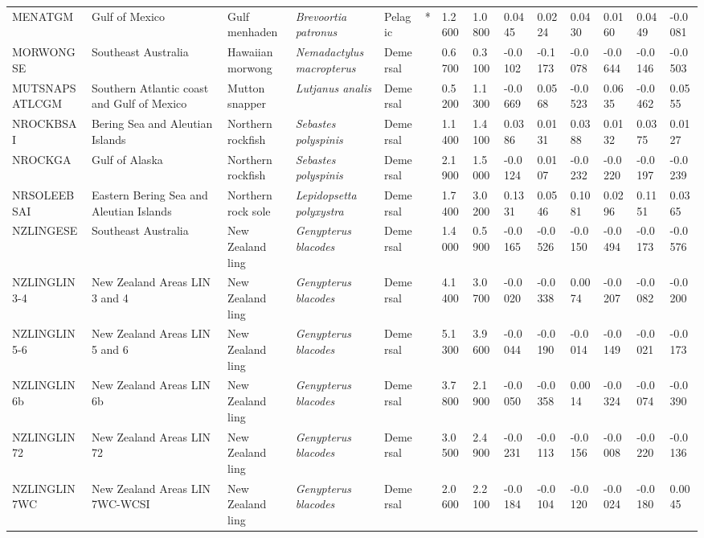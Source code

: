 \begin{longtable}{p{2.6cm}p{1.9cm}p{1.7cm}p{1.6cm}p{1cm}p{0.3cm}p{1cm}p{1cm}p{1cm}p{1.1cm}p{1cm}p{1.1cm}p{1cm}p{1.1cm}}
  MENATGM & Gulf of Mexico & Gulf menhaden & \textit{Brevoortia patronus} & Pelagic & * & 1.2600 & 1.0800 & 0.0445 & 0.0224 & 0.0430 & 0.0160 & 0.0449 & -0.0081 \\ 
  MORWONGSE & Southeast Australia & Hawaiian morwong & \textit{Nemadactylus macropterus} & Demersal &   & 0.6700 & 0.3100 & -0.0102 & -0.1173 & -0.0078 & -0.0644 & -0.0146 & -0.0503 \\ 
  MUTSNAPSATLCGM & Southern Atlantic coast and Gulf of Mexico & Mutton snapper & \textit{Lutjanus analis} & Demersal &   & 0.5200 & 1.1300 & -0.0669 & 0.0568 & -0.0523 & 0.0635 & -0.0462 & 0.0555 \\ 
  NROCKBSAI & Bering Sea and Aleutian Islands & Northern rockfish & \textit{Sebastes polyspinis} & Demersal &   & 1.1400 & 1.4100 & 0.0386 & 0.0131 & 0.0388 & 0.0132 & 0.0375 & 0.0127 \\ 
  NROCKGA & Gulf of Alaska & Northern rockfish & \textit{Sebastes polyspinis} & Demersal &   & 2.1900 & 1.5000 & -0.0124 & 0.0107 & -0.0232 & -0.0220 & -0.0197 & -0.0239 \\ 
  NRSOLEEBSAI & Eastern Bering Sea and Aleutian Islands & Northern rock sole & \textit{Lepidopsetta polyxystra} & Demersal &   & 1.7400 & 3.0200 & 0.1331 & 0.0546 & 0.1081 & 0.0296 & 0.1151 & 0.0365 \\ 
  NZLINGESE & Southeast Australia & New Zealand ling & \textit{Genypterus blacodes} & Demersal &   & 1.4000 & 0.5900 & -0.0165 & -0.0526 & -0.0150 & -0.0494 & -0.0173 & -0.0576 \\ 
  NZLINGLIN3-4 & New Zealand Areas LIN 3 and 4 & New Zealand ling & \textit{Genypterus blacodes} & Demersal &   & 4.1400 & 3.0700 & -0.0020 & -0.0338 & 0.0074 & -0.0207 & -0.0082 & -0.0200 \\ 
  NZLINGLIN5-6 & New Zealand Areas LIN 5 and 6 & New Zealand ling & \textit{Genypterus blacodes} & Demersal &   & 5.1300 & 3.9600 & -0.0044 & -0.0190 & -0.0014 & -0.0149 & -0.0021 & -0.0173 \\ 
  NZLINGLIN6b & New Zealand Areas LIN 6b & New Zealand ling & \textit{Genypterus blacodes} & Demersal &   & 3.7800 & 2.1900 & -0.0050 & -0.0358 & 0.0014 & -0.0324 & -0.0074 & -0.0390 \\ 
  NZLINGLIN72 & New Zealand Areas LIN 72 & New Zealand ling & \textit{Genypterus blacodes} & Demersal &   & 3.0500 & 2.4900 & -0.0231 & -0.0113 & -0.0156 & -0.0008 & -0.0220 & -0.0136 \\ 
  NZLINGLIN7WC & New Zealand Areas LIN 7WC-WCSI & New Zealand ling & \textit{Genypterus blacodes} & Demersal &   & 2.0600 & 2.2100 & -0.0184 & -0.0104 & -0.0120 & -0.0024 & -0.0180 & 0.0045 \\ 

\end{longtable}
